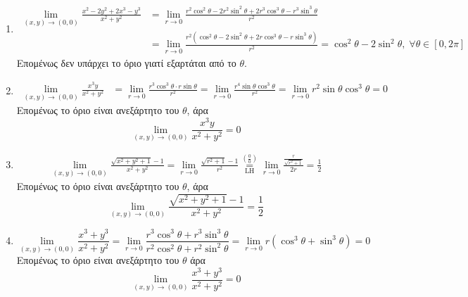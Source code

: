 \begin{examples}
\item {}
    \begin{enumerate}
        \item 
            \begin{align*} \lim\limits_{(x,y)\to (0, 0)} 
                \frac{x^{2}-2y^{2}+2x^{3}-y^{3}}{x^{2}+y^{2}} 
               &= \lim_{r \to 0} \frac{r^{2} \cos^{2}{\theta} - 2r^{2} \sin^{2}{\theta 
               +2r^{3} \cos^{3}{\theta - r^{3} \sin^{3}{\theta}}}}{r^{2}} \\ 
               &= \lim_{r \to 0} \frac{r^{2}(\cos^{2}{\theta} - 2 \sin^{2}{\theta} +2r 
               \cos^{3}{\theta} - r \sin^{3}{\theta})}{r^{2}} = 
               \cos^{2}{\theta} - 2 \sin^{2}{\theta}, \; \forall \theta \in [0, 2 \pi]
            \end{align*}
            Επομένως δεν υπάρχει το όριο γιατί εξαρτάται από το $\theta$.

        \item 
            \begin{align*}
                \lim\limits_{(x,y)\to (0, 0)} \frac{x^{3}y}{x^{2}+y^{2}} &= 
                \lim_{r \to 0} \frac{r^{3} \cos^{3}{\theta} \cdot r 
                    \sin{\theta}}{r^{2}} = \lim_{r \to 0} \frac{r^{4} \sin{\theta} 
                \cos^{3}{\theta}}{r^{2}} = 
                \lim_{r \to 0} r^{2} \sin{\theta} \cos^{3}{\theta} = 0
            \end{align*}
            Επομένως το όριο είναι ανεξάρτητο του $\theta$, άρα 
            \[
                \lim\limits_{(x,y)\to (0,0)} \frac{x^{3}y}{x^{2}+y^{2}} = 0
            \] 

        \item 
            \begin{align*}
                \lim\limits_{(x,y)\to (0, 0)} \frac{\sqrt{x^{2}+y^{2}+1}-1}
                {x^{2}+y^{2}} = \lim_{r \to 0} \frac{\sqrt{r^{2}+1} -1}{r^{2}} 
                \overset{\left(\frac{0}{0}\right)}{\underset{\text{LH}}{=}} 
                \lim_{r \to 0} \frac{\frac{r}{\sqrt{r^{2}+1}}}{2r} = \frac{1}{2}
            \end{align*}
            Επομένως το όριο είναι ανεξάρτητο του $\theta$, άρα 
            \[
                \lim\limits_{(x,y)\to (0, 0)} 
                \frac{\sqrt{x^{2}+y^{2}+1} -1}{x^{2}+y^{2}} = \frac{1}{2} 
            \] 

        \item 
            \[ 
                \lim\limits_{(x,y)\to (0, 0)} \frac{x^{3}+y^{3}}{x^{2}+y^{2}} = \lim_{r \to 0}
                \frac{r^{3} \cos^{3}{\theta} + r^{3} \sin^{3}{\theta}}{r^{2} \cos^{2}{\theta} +
                r^{2} \sin^{2}{\theta}} = \lim_{r \to 0} 
                r(\cos^{3}{\theta} + \sin^{3}{\theta}) = 0
            \] 
            Επομένως το όριο είναι ανεξάρτητο του $\theta$ 
            άρα 
            \[
                \lim\limits_{(x,y)\to (0, 0)} \frac{x^{3}+y^{3}}{x^{2}+y^{2}} = 0 
             \] 
    \end{enumerate}
\end{examples}

